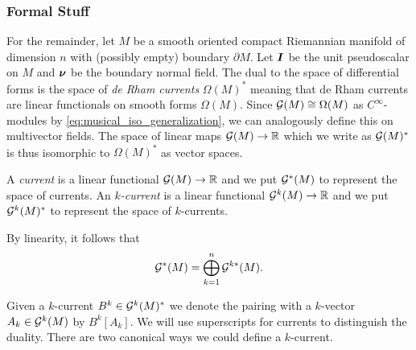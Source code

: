 \documentclass{article}
\begin{document}
\subsubsection{Formal Stuff}
For the remainder, let $M$ be a smooth oriented compact Riemannian manifold of dimension $n$ with (possibly empty) boundary $\partial M$. Let $\boldsymbol{I}$ be the unit pseudoscalar on $M$ and $\boldsymbol{\nu}$ be the boundary normal field. The dual to the space of differential forms is the space of \emph{de Rham currents} $\Omega(M)^*$ meaning that de Rham currents are linear functionals on smooth forms $\Omega(M)$. Since $\mathcal{G}(M)\cong \Omega(M)$ as $C^\infty$-modules by \cref{eq:musical_iso_generalization}, we can analogously define this on multivector fields. The space of linear maps $\mathcal{G}(M) \to \mathbb{R}$ which we write as $\mathcal{G}(M)^*$ is thus isomorphic to $\Omega(M)^*$ as vector spaces.
\begin{definition}
A \emph{current} is a linear functional $\mathcal{G}(M) \to \mathbb{R}$ and we put $\mathcal{G}^*(M)$ to represent the space of currents. An \emph{$k$-current} is a linear functional $\mathcal{G}^k(M) \to \mathbb{R}$ and we put $\mathcal{G}^{k}(M)^*$ to represent the space of $k$-currents.
\end{definition}
By linearity, it follows that
\begin{equation}
\mathcal{G}^*(M) = \bigoplus_{k = 1}^n \mathcal{G}^{k*}(M).
\end{equation}


Given a $k$-current $B^k \in \mathcal{G}^k(M)^*$ we denote the pairing with a $k$-vector $A_k \in \mathcal{G}^k(M)$ by $B^k[A_k]$. We will use superscripts for currents to distinguish the duality. There are two canonical ways we could define a $k$-current. 
\end{document}
